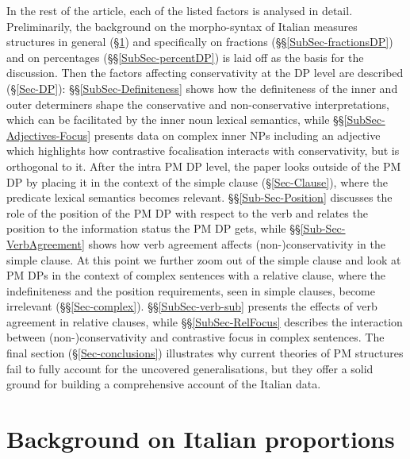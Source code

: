 \documentclass[charis, linguex]{glossa}
\begin{document}
In the rest of the article, each of the listed factors is analysed in detail.
Preliminarily, the background on the morpho-syntax of Italian measures
structures in general (\S\ref{Sec-background}) and specifically on fractions
(\S\S\ref{SubSec-fractionsDP}) and on percentages (\S\S\ref{SubSec-percentDP})
is laid off as the basis for the discussion. Then the factors affecting
conservativity at the DP level are described (\S\ref{Sec-DP}):
\S\S\ref{SubSec-Definiteness} shows how the definiteness of the inner and outer
determiners shape the conservative and non-conservative interpretations, which
can be facilitated by the inner noun lexical semantics, while
\S\S\ref{SubSec-Adjectives-Focus} presents data on complex inner NPs including
an adjective which highlights how contrastive focalisation interacts with
conservativity, but is orthogonal to it. After the intra PM DP level, the paper
looks outside of the PM DP by placing it in the context of the simple clause
(\S\ref{Sec-Clause}), where the predicate lexical semantics becomes relevant.
\S\S\ref{Sub-Sec-Position} discusses the role of the position of the PM DP with
respect to the verb and relates the position to the information status the PM
DP gets, while \S\S\ref{Sub-Sec-VerbAgreement} shows how verb agreement affects
(non-)conservativity in the simple clause. At this point we further zoom out of
the simple clause and look at PM DPs in the context of complex sentences with a
relative clause, where the indefiniteness and the position requirements, seen
in simple clauses, become irrelevant (\S\S\ref{Sec-complex}).
\S\S\ref{SubSec-verb-sub} presents the effects of verb agreement in relative
clauses, while \S\S\ref{SubSec-RelFocus} describes the interaction between
(non-)conservativity and contrastive focus in complex sentences. The final
section (\S\ref{Sec-conclusions}) illustrates why current theories of PM
structures fail to fully account for the uncovered generalisations, but they
offer a solid ground for building a comprehensive account of the Italian data.

\section{Background on Italian proportions} \label{Sec-background}
\end{document}
